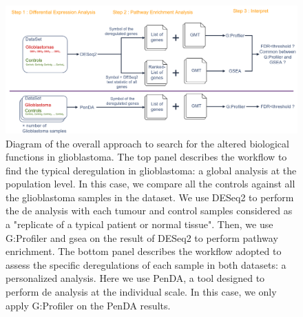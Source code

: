 \begin{figure}
    \centering
    \includegraphics[width=\textwidth]{img/workflow-diagram}
    \caption{
        Diagram of the overall approach to search for the altered biological functions in glioblastoma.
        The top panel describes the workflow to find the typical deregulation in glioblastoma: a global analysis at the population level.
        In this case, we compare all the controls against all the glioblastoma samples in the dataset.
        We use DESeq2 to perform the \acrlong{de} analysis with each tumour and control samples considered as a "replicate of a typical patient or normal tissue".
        Then, we use G:Profiler and \acrshort{gsea} on the result of DESeq2 to perform pathway enrichment.
        The bottom panel describes the workflow adopted to assess the specific deregulations of each sample in both datasets: a personalized analysis.
        Here we use PenDA, a tool designed to perform \acrshort{de} analysis at the individual scale.
        In this case, we only apply G:Profiler on the PenDA results.
    }
    \label{fig:workflow-diagram-global}
\end{figure}

